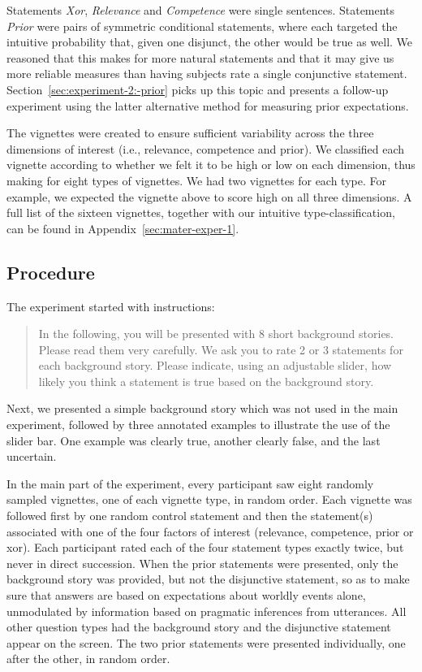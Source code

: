 \documentclass[12pt]{article}
\begin{document}
\noindent Statements \emph{Xor}, \emph{Relevance} and \emph{Competence} were single
sentences. Statements \emph{Prior} were pairs of symmetric conditional statements, where each
targeted the intuitive probability that, given one disjunct, the other would be true as
well. We reasoned that this makes for more natural statements and that it may give us more
reliable measures than having subjects rate a single conjunctive
statement. Section~\ref{sec:experiment-2:-prior} picks up this topic and presents a follow-up
experiment using the latter alternative method for measuring prior expectations.

The vignettes were created to ensure sufficient variability across the three dimensions of
interest (i.e., relevance, competence and prior). We classified each vignette according to
whether we felt it to be high or low on each dimension, thus making for eight types of
vignettes. We had two vignettes for each type. For example, we expected the vignette above to
score high on all three dimensions. A full list of the sixteen vignettes, together with our
intuitive type-classification, can be found in Appendix~\ref{sec:mater-exper-1}. 

\subsection*{Procedure}

The experiment started with instructions:

\begin{quote}
  In the following, you will be presented with 8 short background stories. Please read them
  very carefully. We ask you to rate 2 or 3 statements for each background story. Please
  indicate, using an adjustable slider, how likely you think a statement is true based on the
  background story.
\end{quote}

\noindent Next, we presented a simple background story which was not used in the main
experiment, followed by three annotated examples to illustrate the use of the slider bar. One
example was clearly true, another clearly false, and the last uncertain.

In the main part of the experiment, every participant saw eight randomly sampled vignettes, one
of each vignette type, in random order. Each vignette was followed first by one random control
statement and then the statement(s) associated with one of the four factors of interest
(relevance, competence, prior or xor). Each participant rated each of the four statement types
exactly twice, but never in direct succession. When the prior statements were presented, only
the background story was provided, but not the disjunctive statement, so as to make sure that
answers are based on expectations about worldly events alone, unmodulated by information based
on pragmatic inferences from utterances. All other question types had the background story and
the disjunctive statement appear on the screen. The two prior statements were presented
individually, one after the other, in random order.
\end{document}

